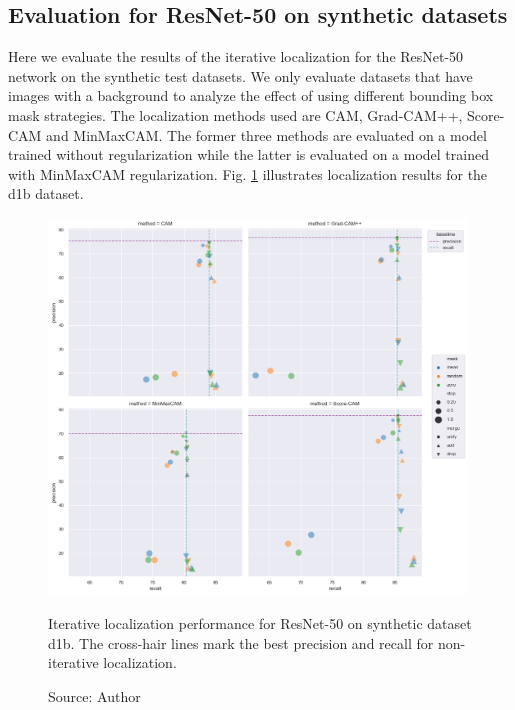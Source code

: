 \subsection{Evaluation for ResNet-50 on synthetic datasets} \label{sec:exp_iter_resnet50_syn}
Here we evaluate the results of the iterative localization for the ResNet-50 network on the synthetic test datasets. We only evaluate datasets that have images with a background to analyze the effect of using different bounding box mask strategies. The localization methods used are CAM, Grad-CAM++, Score-CAM and MinMaxCAM. The former three methods are evaluated on a model trained without regularization while the latter is evaluated on a model trained with MinMaxCAM regularization. Fig. \ref{fig:prec_iter_resnet50_syn_d1b} illustrates localization results for the d1b dataset.

\begin{figure}[h]
    \begin{center}       
    \includegraphics[width=0.99\textwidth]{images/fig_iter_resnet50_syn_d1b.png}
    \caption[Iterative localization performance for ResNet-50 on synthetic dataset d1b]{Iterative localization performance for ResNet-50 on synthetic dataset d1b. The cross-hair lines mark the best precision and recall for non-iterative localization.}
    \caption*{Source: Author}
    \label{fig:prec_iter_resnet50_syn_d1b}
    \end{center}
\end{figure}

